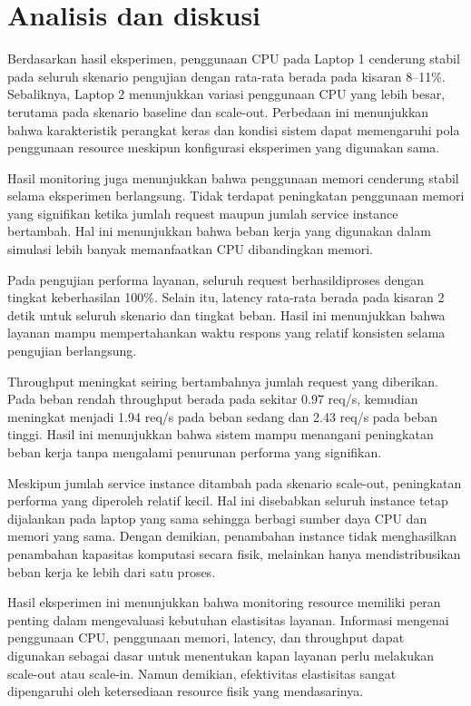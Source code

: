 \documentclass[conference]{IEEEtran}
\begin{document}
\section{Analisis dan diskusi}
Berdasarkan hasil eksperimen, penggunaan CPU pada Laptop 1 cenderung stabil pada seluruh skenario pengujian dengan rata-rata berada pada kisaran 8--11\%. Sebaliknya, Laptop 2 menunjukkan variasi penggunaan CPU yang lebih besar, terutama pada skenario baseline dan scale-out. Perbedaan ini menunjukkan bahwa karakteristik perangkat keras dan kondisi sistem dapat memengaruhi pola penggunaan resource meskipun konfigurasi eksperimen yang digunakan sama.

Hasil monitoring juga menunjukkan bahwa penggunaan memori cenderung stabil selama eksperimen berlangsung. Tidak terdapat peningkatan penggunaan memori yang signifikan ketika jumlah request maupun jumlah service instance bertambah. Hal ini menunjukkan bahwa beban kerja yang digunakan dalam simulasi lebih banyak memanfaatkan CPU dibandingkan memori.

Pada pengujian performa layanan, seluruh request berhasildiproses dengan tingkat keberhasilan 100\%. Selain itu, latency rata-rata berada pada kisaran 2 detik untuk seluruh skenario dan tingkat beban. Hasil ini menunjukkan bahwa layanan mampu mempertahankan waktu respons yang relatif konsisten selama pengujian berlangsung.

Throughput meningkat seiring bertambahnya jumlah request yang diberikan. Pada beban rendah throughput berada pada sekitar 0.97 req/s, kemudian meningkat menjadi 1.94 req/s pada beban sedang dan 2.43 req/s pada beban tinggi. Hasil ini menunjukkan bahwa sistem mampu menangani peningkatan beban kerja tanpa mengalami penurunan performa yang signifikan.

Meskipun jumlah service instance ditambah pada skenario scale-out, peningkatan performa yang diperoleh relatif kecil. Hal ini disebabkan seluruh instance tetap dijalankan pada laptop yang sama sehingga berbagi sumber daya CPU dan memori yang sama. Dengan demikian, penambahan instance tidak menghasilkan penambahan kapasitas komputasi secara fisik, melainkan hanya mendistribusikan beban kerja ke lebih dari satu proses.

Hasil eksperimen ini menunjukkan bahwa monitoring resource memiliki peran penting dalam mengevaluasi kebutuhan elastisitas layanan. Informasi mengenai penggunaan CPU, penggunaan memori, latency, dan throughput dapat digunakan sebagai dasar untuk menentukan kapan layanan perlu melakukan scale-out atau scale-in. Namun demikian, efektivitas elastisitas sangat dipengaruhi oleh ketersediaan resource fisik yang mendasarinya.
\end{document}
